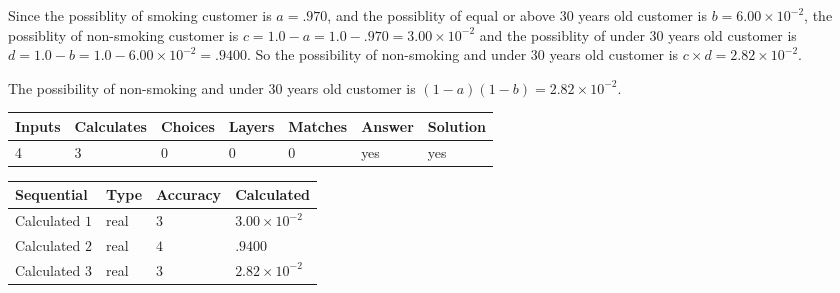 \documentclass[12pt]{article}
\begin{document}
 

Since the possiblity of  %
smoking customer is $ a =  %
.970 $,
and the possiblity of  %
equal or above 30 years old customer is $ b =  %
6.00 \times 10^{-2} $,
the possiblity of  %
non-smoking customer is $ c = 1.0 - a = 1.0 -
.970
=  %
3.00 \times 10^{-2} $ and the possiblity of  %
under 30 years old
customer is $ d = 1.0 - b = 1.0 -  %
6.00 \times 10^{-2} =  %
.9400  $.
So the possibility of  %
 non-smoking and  %
under 30 years old
customer is $ c \times d =  %
2.82 \times 10^{-2} $.
 
 
 
\noindent{}
 
 

 
 
 
\noindent{}
 
 

The possibility of  %
 non-smoking and  %
under 30 years old
customer is $ (1-a)(1-b) =  %
2.82 \times 10^{-2} $.
 
 
\noindent{}
 
 

 
\vspace{0.3in}
   
   
   
   
\noindent\begin{tabular}{|l|l|l|l|l|l|l|}
 \hline
Inputs & Calculates & Choices & Layers & Matches & Answer & Solution \\ \hline
           4 & 
           3 & 
           0
  & 
           0 & 
           0 & 
  yes & 
  yes 
  \\ \hline
 \end{tabular}
   
   
   
   
\noindent{}
   
   
  
  
\noindent\begin{tabular}{|l|l|l|l|}
\hline
 Sequential & Type & Accuracy & Calculated \\ 
\hline
 
 
  Calculated $           1$ & real & $           3 $ & 
 $ 3.00 \times 10^{-2} $ 
 \\  \hline  
 
 
  Calculated $           2$ & real & $           4 $ & 
 $ .9400 $ 
 \\  \hline  
 
 
  Calculated $           3$ & real & $           3 $ & 
 $ 2.82 \times 10^{-2} $ 
 \\  \hline  
 \end{tabular}
   
\end{document}

